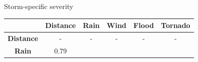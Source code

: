 \documentclass[ignorenonframetext,]{beamer}
\begin{document}
\begin{frame}{Storm-specific severity}

\begin{longtable}[]{@{}cccccc@{}}
\toprule
\begin{minipage}[b]{0.17\columnwidth}\centering\strut
~\strut
\end{minipage} & \begin{minipage}[b]{0.13\columnwidth}\centering\strut
Distance\strut
\end{minipage} & \begin{minipage}[b]{0.08\columnwidth}\centering\strut
Rain\strut
\end{minipage} & \begin{minipage}[b]{0.08\columnwidth}\centering\strut
Wind\strut
\end{minipage} & \begin{minipage}[b]{0.09\columnwidth}\centering\strut
Flood\strut
\end{minipage} & \begin{minipage}[b]{0.10\columnwidth}\centering\strut
Tornado\strut
\end{minipage}\tabularnewline
\midrule
\endhead
\begin{minipage}[t]{0.17\columnwidth}\centering\strut
\textbf{Distance}\strut
\end{minipage} & \begin{minipage}[t]{0.13\columnwidth}\centering\strut
-\strut
\end{minipage} & \begin{minipage}[t]{0.08\columnwidth}\centering\strut
-\strut
\end{minipage} & \begin{minipage}[t]{0.08\columnwidth}\centering\strut
-\strut
\end{minipage} & \begin{minipage}[t]{0.09\columnwidth}\centering\strut
-\strut
\end{minipage} & \begin{minipage}[t]{0.10\columnwidth}\centering\strut
-\strut
\end{minipage}\tabularnewline
\begin{minipage}[t]{0.17\columnwidth}\centering\strut
\textbf{Rain}\strut
\end{minipage} & \begin{minipage}[t]{0.13\columnwidth}\centering\strut
0.79\strut
\end{minipage} & \begin{minipage}[t]{0.08\columnwidth}\centering\strut

\end{minipage}
\end{longtable}
\end{frame}
\end{document}
